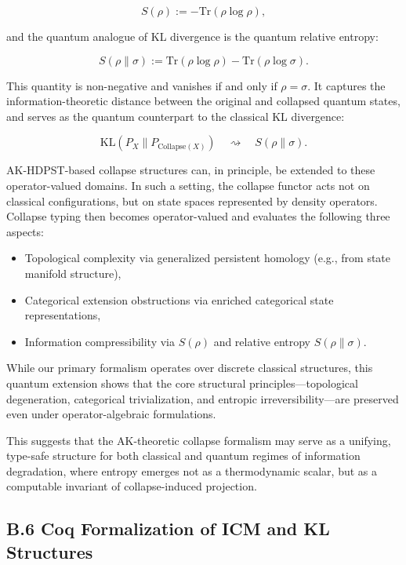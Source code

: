 \documentclass[11pt]{article}
\begin{document}
\[
S(\rho) := -\mathrm{Tr}(\rho \log \rho),
\]

and the quantum analogue of KL divergence is the quantum relative entropy:

\[
S(\rho \| \sigma) := \mathrm{Tr}(\rho \log \rho) - \mathrm{Tr}(\rho \log \sigma).
\]

This quantity is non-negative and vanishes if and only if \( \rho = \sigma \). It captures the information-theoretic distance between the original and collapsed quantum states, and serves as the quantum counterpart to the classical KL divergence:

\[
\mathrm{KL}(P_X \parallel P_{\mathrm{Collapse}(X)}) \quad \rightsquigarrow \quad S(\rho \| \sigma).
\]

AK-HDPST-based collapse structures can, in principle, be extended to these operator-valued domains. In such a setting, the collapse functor acts not on classical configurations, but on state spaces represented by density operators. Collapse typing then becomes operator-valued and evaluates the following three aspects:

\begin{itemize}
    \item Topological complexity via generalized persistent homology (e.g., from state manifold structure),
    \item Categorical extension obstructions via enriched categorical state representations,
    \item Information compressibility via \( S(\rho) \) and relative entropy \( S(\rho \| \sigma) \).
\end{itemize}

While our primary formalism operates over discrete classical structures, this quantum extension shows that the core structural principles—topological degeneration, categorical trivialization, and entropic irreversibility—are preserved even under operator-algebraic formulations.

This suggests that the AK-theoretic collapse formalism may serve as a unifying, type-safe structure for both classical and quantum regimes of information degradation, where entropy emerges not as a thermodynamic scalar, but as a computable invariant of collapse-induced projection.


\subsection*{B.6 Coq Formalization of ICM and KL Structures}
\end{document}
